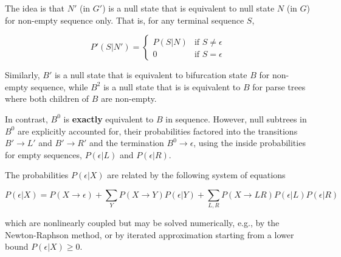 \documentclass[10pt]{article}
\begin{document}
The idea is that $N'$ (in $G'$) is a null state that is equivalent to null state $N$ (in $G$) for non-empty sequence only.
That is, for any terminal sequence $S$,

\[
P'(S|N') = \left\{ \begin{array}{ll} P(S|N) & \mbox{if $S \neq \epsilon$} \\ 0 & \mbox{if $S = \epsilon$} \end{array} \right.
\]

Similarly, $B'$ is a null state that is equivalent to bifurcation state $B$ for non-empty sequence,
while $B^2$ is a null state that is is equivalent to $B$ for parse trees where both children of $B$ are non-empty.

In contrast, $B^0$ is {\bf exactly} equivalent to $B$ in sequence.
However, null subtrees in $B^0$ are explicitly accounted for,
their probabilities factored into the transitions $B' \to L'$ and $B' \to R'$ and the termination $B^0 \to \epsilon$,
using the inside probabilities for empty sequences, $P(\epsilon|L)$ and $P(\epsilon|R)$.

The probabilities $P(\epsilon|X)$ are related by the following system of equations

\[
P(\epsilon|X) = P(X \to \epsilon) + \sum_Y P(X \to Y) P(\epsilon|Y) + \sum_{L,R} P(X \to LR) P(\epsilon|L) P(\epsilon|R)
\]

which are nonlinearly coupled but may be solved numerically, e.g., by the Newton-Raphson method,
or by iterated approximation starting from a lower bound $P(\epsilon|X) \geq 0$.
\end{document}

